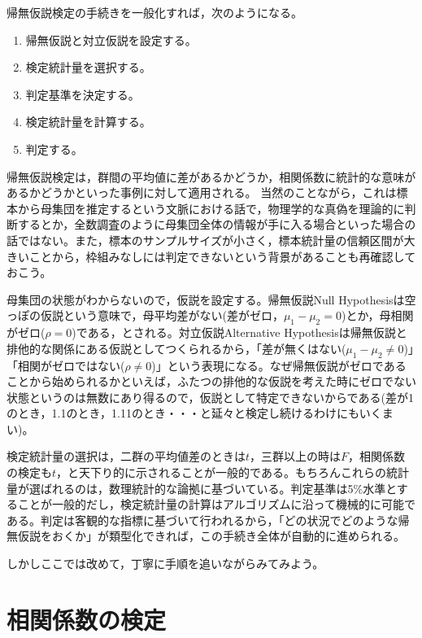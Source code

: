 \documentclass[
  a4paper,
]{ltjsbook}
\providecommand{\tightlist}{%
  \setlength{\itemsep}{0pt}\setlength{\parskip}{0pt}}
\begin{document}
帰無仮説検定の手続きを一般化すれば，次のようになる。

\begin{enumerate}
\def\labelenumi{\arabic{enumi}.}
\tightlist
\item
  帰無仮説と対立仮説を設定する。
\item
  検定統計量を選択する。
\item
  判定基準を決定する。
\item
  検定統計量を計算する。
\item
  判定する。
\end{enumerate}

帰無仮説検定は，群間の平均値に差があるかどうか，相関係数に統計的な意味があるかどうかといった事例に対して適用される。
当然のことながら，これは標本から母集団を推定するという文脈における話で，物理学的な真偽を理論的に判断するとか，全数調査のように母集団全体の情報が手に入る場合といった場合の話ではない。また，標本のサンプルサイズが小さく，標本統計量の信頼区間が大きいことから，枠組みなしには判定できないという背景があることも再確認しておこう。

母集団の状態がわからないので，仮説を設定する。帰無仮説Null
Hypothesisは空っぽの仮説という意味で，母平均差がない(差がゼロ，\(\mu_1 - \mu_2 = 0\))とか，母相関がゼロ(\(\rho = 0\))である，とされる。対立仮説Alternative
Hypothesisは帰無仮説と排他的な関係にある仮説としてつくられるから，「差が無くはない(\(\mu_1 - \mu_2 \neq 0\))」「相関がゼロではない(\(\rho \neq 0\))」という表現になる。なぜ帰無仮説がゼロであることから始められるかといえば，ふたつの排他的な仮説を考えた時にゼロでない状態というのは無数にあり得るので，仮説として特定できないからである(差が1のとき，1.1のとき，1.11のとき・・・と延々と検定し続けるわけにもいくまい)。

検定統計量の選択は，二群の平均値差のときは\(t\)，三群以上の時は\(F\)，相関係数の検定も\(t\)，と天下り的に示されることが一般的である。もちろんこれらの統計量が選ばれるのは，数理統計的な論拠に基づいている。判定基準は5\%水準とすることが一般的だし，検定統計量の計算はアルゴリズムに沿って機械的に可能である。判定は客観的な指標に基づいて行われるから，「どの状況でどのような帰無仮説をおくか」が類型化できれば，この手続き全体が自動的に進められる。

しかしここでは改めて，丁寧に手順を追いながらみてみよう。

\section{相関係数の検定}\label{ux76f8ux95a2ux4fc2ux6570ux306eux691cux5b9a}
\end{document}
